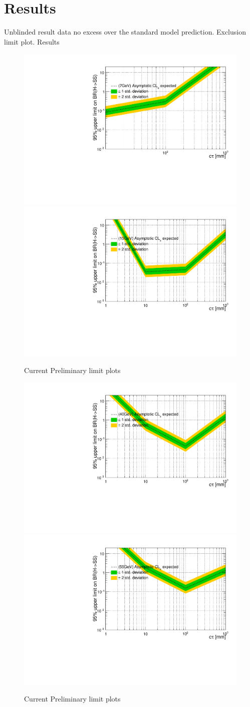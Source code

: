 \clearpage
\chapter{Results}\label{sec:results}
Unblinded result data no excess over the standard model prediction.
Exclusion limit plot.
Results
 \begin{figure}[h!]
   \caption{Current Preliminary limit plots}
   \label{fig:Limit}
   \centering
   \includegraphics[width=0.48\linewidth]{figs/7GeVUpperLimit.pdf}
   \includegraphics[width=0.48\linewidth]{figs/15GeVUpperLimit.pdf}
 \end{figure}
 \begin{figure}[h!]
   \caption{Current Preliminary limit plots}
   \label{fig:Limit2}
   \centering
   \includegraphics[width=0.48\linewidth]{figs/40GeVUpperLimit.pdf}
   \includegraphics[width=0.48\linewidth]{figs/55GeVUpperLimit.pdf}
 \end{figure}

